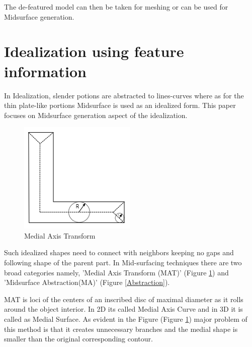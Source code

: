 The de-featured model can then be taken for meshing or can be used for Midsurface generation.


\section{Idealization using feature information}

In Idealization, slender potions are abstracted to lines-curves where as for the thin plate-like portions Midsurface is used as an idealized form.  This paper focuses on Midsurface generation aspect of the idealization.
%	
	
	\begin{figure}
	\centering
	\vspace{-.6cm}
	\includegraphics[scale=0.65]{..//Common/images//MAT.png}
	\vspace{.2cm}
	\caption{Medial Axis Transform}
	\label{MAT}
	\vspace{-.5cm}
	\end{figure}

Such idealized shapes need to connect with neighbors keeping no gaps and following shape of the parent part. In Mid-surfacing techniques there are two broad categories namely, 'Medial Axis Transform (MAT)'   (Figure \ref{MAT}) and 'Midsurface Abstraction(MA)'   (Figure \ref{Abstraction}). 

MAT is  loci of the centers of an inscribed disc of maximal diameter as it rolls around the object interior.  In 2D its called Medial Axis Curve and in 3D it is called as Medial Surface. As evident in the Figure  (Figure \ref{MAT}) major problem of this method is that it creates unnecessary branches and the medial shape is smaller than the original corresponding contour. 

